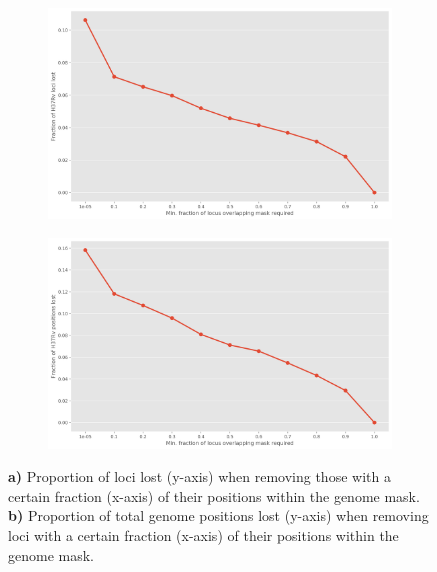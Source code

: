 \begin{figure}
     \centering
     \begin{subfigure}[b]{0.475\textwidth}
         \centering
         \includegraphics[width=\textwidth]{Appendix1/Figs/loci-lost.png}
         \caption{}
         \label{fig:loci-lost}
     \end{subfigure}
     \hfill
     \begin{subfigure}[b]{0.475\textwidth}
         \centering
         \includegraphics[width=\textwidth]{Appendix1/Figs/pos-lost.png}
         \caption{}
         \label{fig:pos-lost}
     \end{subfigure}
        \caption{\textbf{a)} Proportion of loci lost (y-axis) when removing those with a certain fraction (x-axis) of their positions within the genome mask. \textbf{b)} Proportion of total genome positions lost (y-axis) when removing loci with a certain fraction (x-axis) of their positions within the genome mask.}
        \label{fig:loci-mask}
\end{figure}

